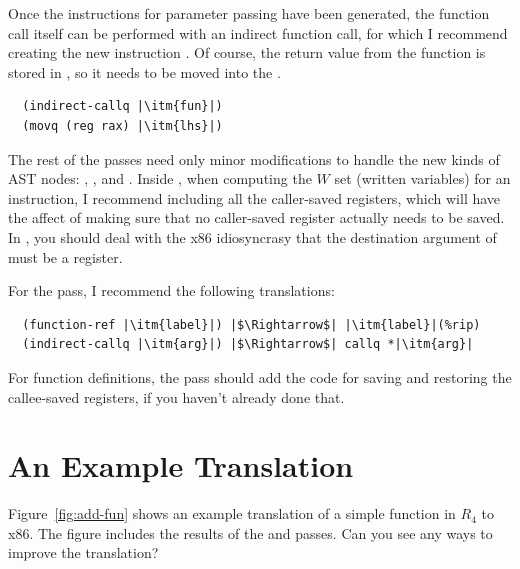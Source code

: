 \documentclass[11pt]{book}
\begin{document}
Once the instructions for parameter passing have been generated, the
function call itself can be performed with an indirect function call,
for which I recommend creating the new instruction
. Of course, the return value from the function
is stored in , so it needs to be moved into the .
\begin{lstlisting}
  (indirect-callq |\itm{fun}|)
  (movq (reg rax) |\itm{lhs}|)
\end{lstlisting}

The rest of the passes need only minor modifications to handle the new
kinds of AST nodes: , , and
. Inside , when computing the $W$ set
(written variables) for an  instruction, I
recommend including all the caller-saved registers, which will have
the affect of making sure that no caller-saved register actually needs
to be saved. In , you should deal with the
x86 idiosyncrasy that the destination argument of  must be
a register.

For the  pass, I recommend the following translations:
\begin{lstlisting}
  (function-ref |\itm{label}|) |$\Rightarrow$| |\itm{label}|(%rip)
  (indirect-callq |\itm{arg}|) |$\Rightarrow$| callq *|\itm{arg}|
\end{lstlisting}
For function definitions, the  pass should add the
code for saving and restoring the callee-saved registers, if you
haven't already done that.

\section{An Example Translation}

Figure~\ref{fig:add-fun} shows an example translation of a simple
function in $R_4$ to x86. The figure includes the results of the
 and  passes.  Can you see any
ways to improve the translation?
\end{document}
